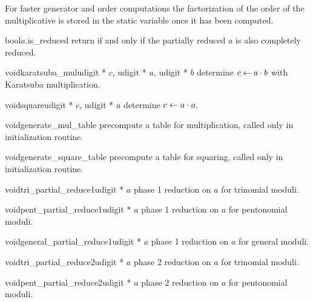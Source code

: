 \begin{techdoc}
  For faster generator and order computations the factorization of the order of the
  multiplicative is stored in the static variable  once it has been computed.
\end{techdoc}

\begin{Tcfcode}{bool}{$a$.is_reduced}{}
  return \TRUE if and only if the partially reduced $a$ is also completely reduced.
\end{Tcfcode}

\begin{Tfcode}{void}{karatsuba_mul}{udigit * $c$, udigit * $a$, udigit * $b$}
  determine $c \leftarrow a \cdot b$ with Karatsuba multiplication. 
\end{Tfcode}

\begin{Tfcode}{void}{square}{udigit * $c$, udigit * $a$}
  determine $c \leftarrow a \cdot a$.
\end{Tfcode}

\begin{Tfcode}{void}{generate_mul_table}{}
  precompute a table for multiplication, called only in initialization routine.
\end{Tfcode}

\begin{Tfcode}{void}{generate_square_table}{}
  precompute a table for squaring, called only in initialization routine.
\end{Tfcode}

\begin{Tfcode}{void}{tri_partial_reduce1}{udigit * $a$}
  phase 1 reduction on $a$ for trinomial moduli.
\end{Tfcode}

\begin{Tfcode}{void}{pent_partial_reduce1}{udigit * $a$}
  phase 1 reduction on $a$ for pentonomial moduli.
\end{Tfcode}

\begin{Tfcode}{void}{general_partial_reduce1}{udigit * $a$}
  phase 1 reduction on $a$ for general moduli.
\end{Tfcode}

\begin{Tfcode}{void}{tri_partial_reduce2}{udigit * $a$}
  phase 2 reduction on $a$ for trinomial moduli.
\end{Tfcode}

\begin{Tfcode}{void}{pent_partial_reduce2}{udigit * $a$}
  phase 2 reduction on $a$ for pentonomial moduli.
\end{Tfcode}

